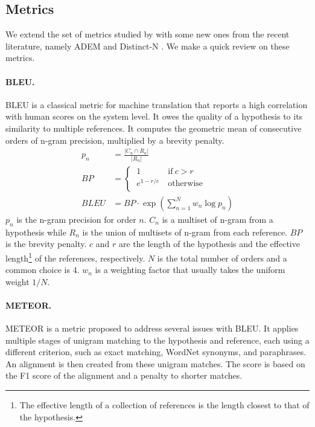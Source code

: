 \documentclass[runningheads]{llncs}
\begin{document}
    \subsection{Metrics}
    We extend the set of metrics studied by \cite{HowNot} with some new ones from the recent literature, namely ADEM \cite{ADEM} and Distinct-N \cite{MMI}. We make a quick review on these metrics.

    \paragraph{BLEU.}
    BLEU \cite{BLEU} is a classical metric for machine translation that reports a high correlation with human scores on the system level. It owes the quality of a hypothesis to its similarity to multiple references. It computes the geometric mean of consecutive orders of n-gram precision, multiplied by a brevity penalty.
    \begin{align}
        p_n &= \frac{ |C_n \cap R_n| }{ |R_n| } \\
        \textit{BP} &=
        \begin{cases}
            \ 1 \ & \text{if} \  c > r \\
            \ e^{1 - r/c} \ & \text{otherwise} \\
        \end{cases} \\
        \textit{BLEU} &=
        \textit{BP} \cdot \exp \left( \sum_{n=1}^N w_n \log p_n \right)
    \end{align}
    $p_n$ is the n-gram precision for order $n$. $C_n$ is a multiset of n-gram from a hypothesis while $R_n$ is the union of multisets of n-gram from each reference. $\textit{BP}$ is the brevity penalty. $c$ and $r$ are the length of the hypothesis and the effective length\footnote{The effective length of a collection of references is the length closest to that of the hypothesis.} of the references, respectively. $N$ is the total number of orders and a common choice is 4. $w_n$ is a weighting factor that usually takes the uniform weight $1 / N$.

    \paragraph{METEOR.}
    METEOR \cite{METEOR} is a metric proposed to address several issues with BLEU. It applies multiple stages of unigram matching to the hypothesis and reference, each using a different criterion, such as exact matching, WordNet synonyms, and paraphrases. An alignment is then created from these unigram matches. The score is based on the F1 score of the alignment and a penalty to shorter matches.
\end{document}
